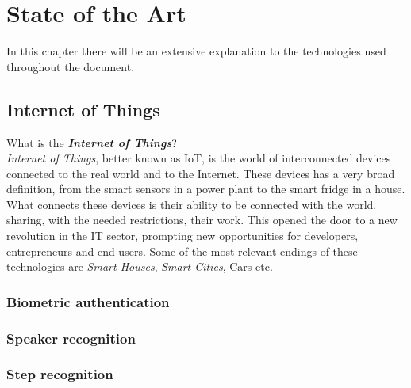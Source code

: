 \chapter{State of the Art}

In this chapter there will be an extensive explanation to the technologies used
throughout the document.

\section{Internet of Things}

What is the \textbf{\textit{Internet of Things}}?\\
\textit{Internet of Things}, better known as IoT, is the world of interconnected devices
connected to the real world and to the Internet. These devices has a very
broad definition, from the smart sensors in a power plant to the smart fridge in
a house. What connects these devices is their ability to be connected with the world,
sharing, with the needed restrictions, their work. This opened the door to a new
revolution in the IT sector, prompting new opportunities for developers, entrepreneurs
and end users. Some of the most relevant endings of these technologies are \textit{Smart Houses},
\textit{Smart Cities}, Cars etc. %


\subsection{Biometric authentication}


\subsection{Speaker recognition}

\subsection{Step recognition}




